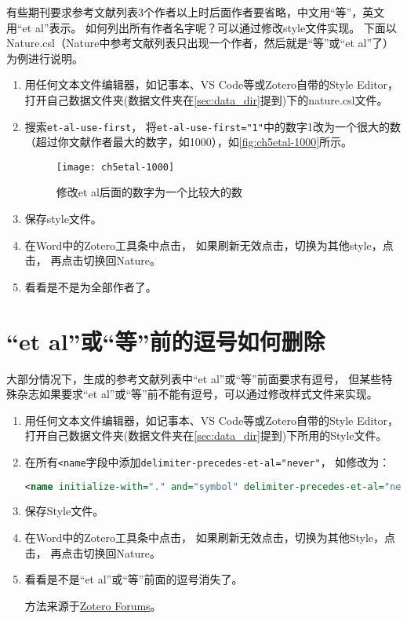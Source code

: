 \documentclass[cn,11pt,chinese]{elegantbook}
\begin{document}
			有些期刊要求参考文献列表3个作者以上时后面作者要省略，中文用“等”，英文用“et al”表示。
			如何列出所有作者名字呢？可以通过修改style文件实现。
			下面以Nature.csl（Nature中参考文献列表只出现一个作者，然后就是“等”或“et al”了）为例进行说明。
		
			\begin{enumerate}
				\item 
					用任何文本文件编辑器，如记事本、VS Code等或Zotero自带的Style Editor，
					打开自己数据文件夹(数据文件夹在\cref{sec:data_dir}提到)下的nature.csl文件。
				\item 搜索\verb|et-al-use-first|，
				将\verb|et-al-use-first="1"|中的数字1改为一个很大的数
				（超过你文献作者最大的数字，如1000），如\autoref{fig:ch5etal-1000}所示。
					\begin{figure}[ht]
						\centering
						\texttt{[image: ch5etal-1000]}
						\caption{修改et al后面的数字为一个比较大的数}
						\label{fig:ch5etal-1000}
					\end{figure}
				\item 保存style文件。
				\item 在Word中的Zotero工具条中点击，
				如果刷新无效点击，切换为其他style，点击，
				再点击切换回Nature。
				\item 看看是不是为全部作者了。
			\end{enumerate}

		\section{“et al”或“等”前的逗号如何删除}\label{sec:comma-before-et-al}

			大部分情况下，生成的参考文献列表中“et al”或“等”前面要求有逗号，
			但某些特殊杂志如果要求“et al”或“等”前不能有逗号，可以通过修改样式文件来实现。
				\begin{enumerate}
				\item 
					用任何文本文件编辑器，如记事本、VS Code等或Zotero自带的Style Editor，
					打开自己数据文件夹(数据文件夹在\cref{sec:data_dir}提到)下所用的Style文件。
				\item 在所有\verb|<name|字段中添加\verb|delimiter-precedes-et-al="never"|，
					如修改为：	
					
				\begin{lstlisting}[language=XML]
				<name initialize-with="." and="symbol" delimiter-precedes-et-al="never">
				\end{lstlisting}
					
				\item 保存Style文件。
				\item 在Word中的Zotero工具条中点击，
					如果刷新无效点击，切换为其他Style，点击，
					再点击切换回Nature。
				\item 看看是不是“et al”或“等”前面的逗号消失了。
		
		方法来源于\href{https://link.zhihu.com/?target=https%3A//forums.zotero.org/discussion/89728/et-al-without-comma%23latest}
		{Zotero Forums}。
			\end{enumerate}
\end{document}
